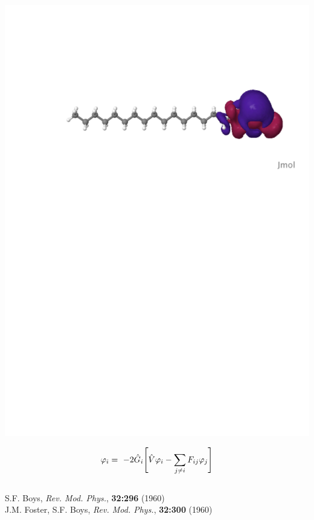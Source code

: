 \begin{frame}
\begin{columns}
\begin{column}[b]{0.48\linewidth}
{    \includegraphics[scale=0.25, clip, viewport = 80 560 600 700]{figures/loc_orb_3.pdf}\\

    \vspace{2mm}

    \begin{equation}
        \nonumber
        \varphi_i =\ -2\hat{G}_i\Bigg[\hat{V} \varphi_i
        - \sum_{j \neq i}F_{ij} \varphi_j\Bigg]
    \end{equation}
}
    \end{column}
    \end{columns}

    \vspace{4mm}

    \centering
    \tiny
    S.F. Boys,
    {\it Rev. Mod. Phys.},
    \textbf{32:296}
    (1960)\\
    J.M. Foster, S.F. Boys,
    {\it Rev. Mod. Phys.},
    \textbf{32:300}
    (1960)
\end{frame}

